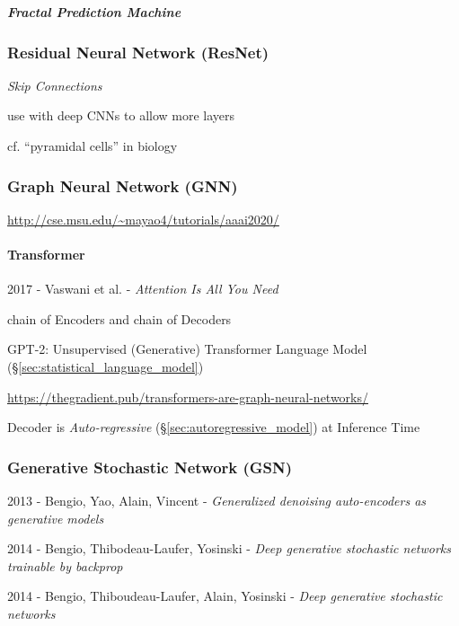 \subparagraph{Fractal Prediction Machine}
\label{sec:fractal_prediction_machine}\hfill



\subsubsection{Residual Neural Network (ResNet)}\label{sec:resnet}

\emph{Skip Connections}

use with deep CNNs to allow more layers

cf. ``pyramidal cells'' in biology



\subsubsection{Graph Neural Network (GNN)}\label{sec:gnn}

\url{http://cse.msu.edu/~mayao4/tutorials/aaai2020/}



\paragraph{Transformer}\label{sec:transformer}\hfill

2017 - Vaswani et al. - \emph{Attention Is All You Need}

chain of Encoders and chain of Decoders

GPT-2: Unsupervised (Generative) Transformer Language Model
(\S\ref{sec:statistical_language_model})

\url{https://thegradient.pub/transformers-are-graph-neural-networks/}

Decoder is \emph{Auto-regressive} (\S\ref{sec:autoregressive_model})
at Inference Time



\subsubsection{Generative Stochastic Network (GSN)}\label{sec:gsn}

2013 - Bengio, Yao, Alain, Vincent -
\emph{Generalized denoising auto-encoders as generative models}

2014 - Bengio, Thibodeau-Laufer, Yosinski -
\emph{Deep generative stochastic networks trainable by backprop}

2014 - Bengio, Thiboudeau-Laufer, Alain, Yosinski -
\emph{Deep generative stochastic networks}



